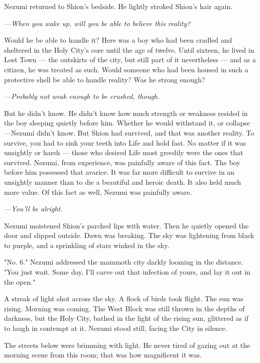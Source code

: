 Nezumi returned to Shion's bedside. He lightly stroked Shion's hair
again.

\emph{---When you wake up, will you be able to believe this reality?}

Would he be able to handle it? Here was a boy who had been cradled and
sheltered in the Holy City's core until the age of twelve. Until
sixteen, he lived in Lost Town --- the outskirts of the city, but still
part of it nevertheless --- and as a citizen, he was treated as such.
Would someone who had been housed in such a protective shell be able to
handle reality? Was he strong enough?

\emph{---Probably not weak enough to be crushed, though.}

But he didn't know. He didn't know how much strength or weakness resided
in the boy sleeping quietly before him. Whether he would withstand it,
or collapse ---Nezumi didn't know. But Shion had survived, and that was
another reality. To survive, you had to sink your teeth into Life and
hold fast. No matter if it was unsightly or harsh --- those who desired
Life most greedily were the ones that survived. Nezumi, from experience,
was painfully aware of this fact. The boy before him possessed that
avarice. It was far more difficult to survive in an unsightly manner
than to die a beautiful and heroic death. It also held much more value.
Of this fact as well, Nezumi was painfully aware.

\emph{---You'll be alright.}

Nezumi moistened Shion's parched lips with water. Then he quietly opened
the door and slipped outside. Dawn was breaking. The sky was lightening
from black to purple, and a sprinkling of stars winked in the sky.

"No. 6." Nezumi addressed the mammoth city darkly looming in the
distance. "You just wait. Some day, I'll carve out that infection of
yours, and lay it out in the open."

A streak of light shot across the sky. A flock of birds took flight. The
sun was rising. Morning was coming. The West Block was still thrown in
the depths of darkness, but the Holy City, bathed in the light of the
rising sun, glittered as if to laugh in contempt at it. Nezumi stood
still, facing the City in silence.

\mybreak

The streets below were brimming with light. He never tired of gazing out
at the morning scene from this room; that was how magnificent it was.

